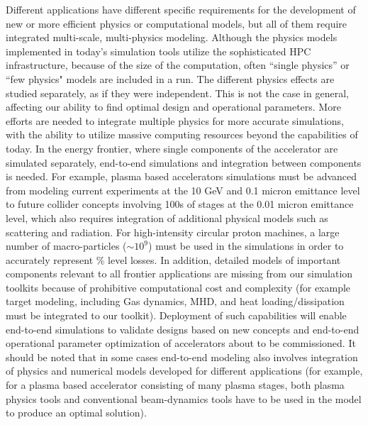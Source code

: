  Different applications have different specific
requirements for the development of new or more efficient physics
or computational models, but all of them require integrated
multi-scale, multi-physics modeling.  
Although the physics models implemented in today's simulation tools utilize the  sophisticated HPC infrastructure, because of the size of the computation, often ``single physics'' or ``few physics" models are included in a run. The different physics effects are studied separately, as if they were independent.  This is not the case in general, affecting our ability to find optimal design and operational parameters.  More efforts are needed to integrate multiple physics for more accurate simulations, with the ability to utilize massive computing resources beyond the capabilities of today. 
   In the energy frontier, where single components of the accelerator are simulated separately, end-to-end simulations and integration between components is needed.  For example, plasma based accelerators simulations must be advanced from modeling current experiments at the 10 GeV and 0.1 micron emittance level to future collider concepts involving 100s of stages at the 0.01 micron emittance level, which also requires integration of additional physical models such as scattering and radiation. For high-intensity circular proton machines, a large number of macro-particles ($\sim 10^9$) must be used in the simulations in order to accurately represent \% level losses. In addition, detailed models of important components relevant to all frontier applications are missing from our simulation toolkits because of prohibitive computational cost and complexity (for example target modeling, including Gas dynamics, MHD, and heat loading/dissipation must be integrated to our toolkit). 
Deployment of such capabilities
will enable end-to-end simulations to validate designs based on
new concepts and end-to-end operational parameter optimization of
accelerators about to be commissioned.  It should be noted that
in some cases end-to-end modeling also involves integration of physics
and numerical models developed for different applications (for
example, for a plasma based accelerator consisting of many plasma
stages, both plasma physics tools and conventional beam-dynamics
tools have to be used in the model to produce an optimal
solution).

